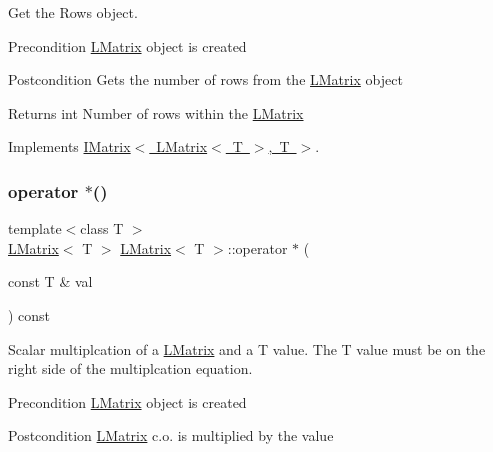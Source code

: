 Get the Rows object. 

\begin{DoxyPrecond}{Precondition}
\mbox{\hyperlink{class_l_matrix}{L\+Matrix}} object is created 
\end{DoxyPrecond}
\begin{DoxyPostcond}{Postcondition}
Gets the number of rows from the \mbox{\hyperlink{class_l_matrix}{L\+Matrix}} object 
\end{DoxyPostcond}
\begin{DoxyReturn}{Returns}
int Number of rows within the \mbox{\hyperlink{class_l_matrix}{L\+Matrix}} 
\end{DoxyReturn}


Implements \mbox{\hyperlink{class_i_matrix_a58632b018f4023768db7963e22f468da}{I\+Matrix$<$ L\+Matrix$<$ T $>$, T $>$}}.

\mbox{\label{class_l_matrix_ac8df9082c434b41a98d26defb95ea388}} 
\subsubsection{\texorpdfstring{operator $\ast$()}{operator *()}}
{\footnotesize\ttfamily template$<$class T $>$ \\
\mbox{\hyperlink{class_l_matrix}{L\+Matrix}}$<$ T $>$ \mbox{\hyperlink{class_l_matrix}{L\+Matrix}}$<$ T $>$\+::operator $\ast$ (\begin{DoxyParamCaption}\item[{const T \&}]{val }\end{DoxyParamCaption}) const\hspace{0.3cm}{\ttfamily [virtual]}}



Scalar multiplcation of a \mbox{\hyperlink{class_l_matrix}{L\+Matrix}} and a T value. The T value must be on the right side of the multiplcation equation. 

\begin{DoxyPrecond}{Precondition}
\mbox{\hyperlink{class_l_matrix}{L\+Matrix}} object is created 
\end{DoxyPrecond}
\begin{DoxyPostcond}{Postcondition}
\mbox{\hyperlink{class_l_matrix}{L\+Matrix}} c.\+o. is multiplied by the value 
\end{DoxyPostcond}

